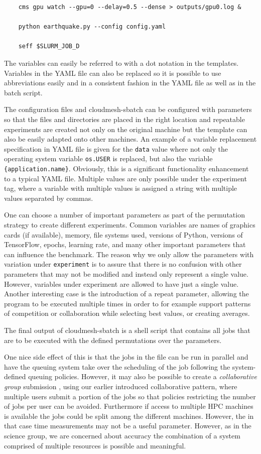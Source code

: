 \documentclass[utf8]{FrontiersinVancouver} %
\begin{document}
{{\begin{Verbatim}
    cms gpu watch --gpu=0 --delay=0.5 --dense > outputs/gpu0.log &

    python earthquake.py --config config.yaml

    seff $SLURM_JOB_D
\end{Verbatim}
}

The variables can easily be referred to with a dot notation in the
templates.  Variables in the YAML file can also be replaced so it is
possible to use abbreviations easily and in a consistent fashion in
the YAML file as well as in the batch script.

The configuration files and cloudmesh-sbatch can be configured with
parameters so that the files and directories are placed in the right
location and repeatable experiments are created not only on the
original machine but the template can also be easily adapted onto
other machines. An example of a variable replacement specification in
YAML file is given for the \verb|data| value where not only the
operating system variable \verb|os.USER| is replaced, but also the
variable \verb|{application.name}|. Obviously, this is a significant
functionality enhancement to a typical YAML file.  Multiple values are
only possible under the experiment tag, where a variable with multiple
values is assigned a string with multiple values separated by commas.

One can choose a number of important parameters as part of the
permutation strategy to create different experiments. Common variables
are names of graphics cards (if available), memory, file systems used,
versions of Python, versions of TensorFlow, epochs, learning rate, and
many other important parameters that can influence the benchmark.  The
reason why we only allow the parameters with variation under
\verb|experiment| is to assure that there is no confusion with other
parameters that may not be modified and instead only represent a
single value. However, variables under experiment are allowed to have
just a single value.  Another interesting case is the introduction of
a repeat parameter, allowing the program to be executed multiple times
in order to for example support patterns of competition or
collaboration while selecting best values, or creating averages.


The final output of cloudmesh-sbatch is a shell script that contains
all jobs that are to be executed with the defined permutations over the
parameters.

One nice side effect of this is that the jobs in the file can be run
in parallel and have the queuing system take over the scheduling of
the job following the system-defined queuing policies. However, it may
also be possible to create a {\it collaborative group} submission ,
using our earlier introduced collaborative pattern, where multiple
users submit a portion of the jobs so that policies restricting the
number of jobs per user can be avoided. Furthermore if access to
multiple HPC machines is available the jobs could be split among the
different machines. However, the in that case time measurements may
not be a useful parameter. However, as in the science group, we are
concerned about accuracy the combination of a system comprised of
multiple resources is possible and meaningful.

}
\end{document}
